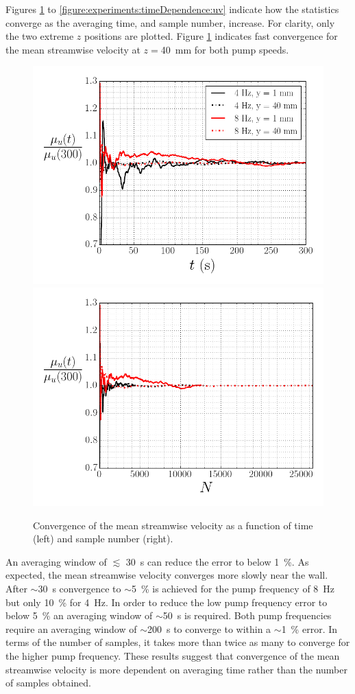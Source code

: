 \documentclass[12pt,oneside,a4paper]{article}
\begin{document}
Figures \ref{figure:experiments:timeDependence:meanUx} to \ref{figure:experiments:timeDependence:uv} indicate how the statistics converge as the averaging time, and sample number, increase. For clarity, only the two extreme $z$ positions are plotted. Figure  \ref{figure:experiments:timeDependence:meanUx} indicates fast convergence for the mean streamwise velocity at $z=$\SI{40}{mm} for both pump speeds.
%
\begin{figure}[!h]
\centering
\includegraphics[width=0.5\linewidth]{images/LDA_timeDependenceImages/UxMeanTConvergence.png}\hfill
\includegraphics[width=0.5\linewidth]{images/LDA_timeDependenceImages/UxMeanNConvergence.png}\\
\caption{Convergence of the mean streamwise velocity as a function of time (left) and sample number (right).}
\label{figure:experiments:timeDependence:meanUx}
\end{figure}
%
 An averaging window of $\lesssim$ \SI{30}{s} can reduce the error to below \SI{1}{\%}. As expected, the mean streamwise velocity converges more slowly near the wall. After $\sim$\SI{30}{s} convergence to $\sim$\SI{5}{\%} is achieved for the pump frequency of \SI{8}{Hz} but only \SI{10}{\%} for \SI{4}{Hz}. In order to reduce the low pump frequency error to below \SI{5}{\%} an averaging window of $\sim$\SI{50}{s} is required. Both pump frequencies require an averaging window of $\sim$\SI{200}{s} to converge to within a $\sim$\SI{1}{\%} error. In terms of the number of samples, it takes more than twice as many to converge for the higher pump frequency. These results suggest that convergence of the mean streamwise velocity is more dependent on averaging time rather than the number of samples obtained. 
 
\end{document}
